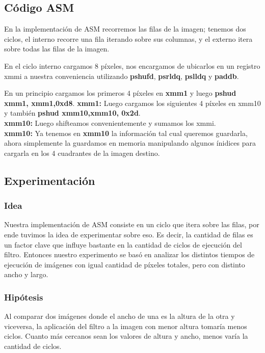 \subsection{Código ASM}
\par{En la implementación de ASM recorremos las filas de la imagen; tenemos dos ciclos, el interno recorre una fila iterando sobre sus columnas, y el externo itera sobre todas las filas de la imagen.}
\par{En el ciclo interno cargamos 8 píxeles, nos encargamos de ubicarlos en un registro xmmi a nuestra conveniencia utilizando \textbf{pshufd}, \textbf{psrldq}, \textbf{pslldq} y \textbf{paddb}.}
\par{En un principio cargamos los primeros 4 píxeles en \textbf{xmm1} y luego \textbf{pshud xmm1, xmm1,0xd8}.}
	\textbf{xmm1:}
	Luego cargamos los siguientes 4 píxeles en xmm10 y también \textbf{pshud xmm10,xmm10, 0x2d}.\\
	\textbf{xmm10:}
	Luego shifteamos convenientemente y sumamos los xmmi.\\
	\textbf{xmm10:}
	Ya tenemos en \textbf{xmm10} la información tal cual queremos guardarla, ahora simplemente la guardamos en memoria manipulando algunos ínidices para cargarla en los 4 cuadrantes de la imagen destino.
	
\subsection{Experimentación}

\subsubsection{Idea}
\par{Nuestra implementación de ASM consiste en un ciclo que itera sobre las filas, por ende tuvimos la idea de experimentar sobre eso. Es decir, la cantidad de filas es un factor clave que influye bastante en la cantidad de ciclos de ejecución del filtro. Entonces nuestro experimento se basó en analizar los distintos tiempos de ejecución de imágenes con igual cantidad de píxeles totales, pero con distinto ancho y largo.}

\subsubsection{Hipótesis}
\par{Al comparar dos imágenes donde el ancho de una es la altura de la otra y viceversa, la aplicación del filtro a la imagen con menor altura tomaría menos ciclos. Cuanto más cercanos sean los valores de altura y ancho, menos varía la cantidad de ciclos.}
	
